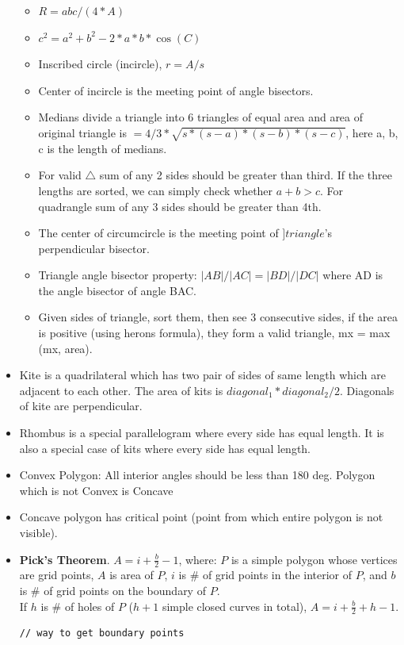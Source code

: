 \documentclass[8pt, a4paper, oneside, twocolumn]{extarticle}
\begin{document}
\begin{itemize}
\begin{itemize}
        \item $R = abc/(4*A)$
        \item $c^2 = a^2 + b^2 - 2*a*b*\cos(C)$
        \item Inscribed circle (incircle), $r = A/s$
        \item Center of incircle is the meeting point of angle bisectors.
        \item Medians divide a triangle into 6 triangles of equal area and area of original triangle is $= 4/3 * \sqrt{s * (s - a) * (s - b) * (s - c)}$, here a, b, c is the length of medians.
        \item For valid $\triangle$ sum of any 2 sides should be greater than third. If the three lengths are sorted, we can simply check whether $a + b > c$. For quadrangle sum of any 3 sides should be greater than 4th.
        \item The center of circumcircle is the meeting point of $]triangle$'s perpendicular bisector.
        \item Triangle angle bisector property: $|AB|/|AC| = |BD|/|DC|$ where AD is the angle bisector of angle BAC. 
        \item Given sides of triangle, sort them, then see 3 consecutive sides, if the area is positive (using herons formula), they form a valid triangle, mx = max (mx, area).
    \end{itemize}
    \item Kite is a quadrilateral which has two pair of sides of same length which are adjacent to each other. The area of kits is $diagonal_1*diagonal_2/2$. Diagonals of kite are perpendicular.
    \item Rhombus is a special parallelogram where every side has equal length. It is also a special case of kits where every side has equal length.    
    \item Convex Polygon: All interior angles should be less than 180 deg. Polygon which is not Convex is Concave
    \item Concave polygon has critical point (point from which entire polygon is not visible).
    \item \textbf{Pick's Theorem}. $A=i+\frac{b}{2}-1$, where: $P$ is a simple polygon whose vertices are grid points, $A$ is area of $P$, $i$ is \# of grid points in the interior of $P$, and $b$ is \# of grid points on the boundary of $P$. \\
    If $h$ is \# of holes of $P$ ($h+1$ simple closed curves in total), $A=i+\frac{b}{2}+h-1$.
    \begin{verbatim}
// way to get boundary points


\end{verbatim}
\end{itemize}
\end{document}
